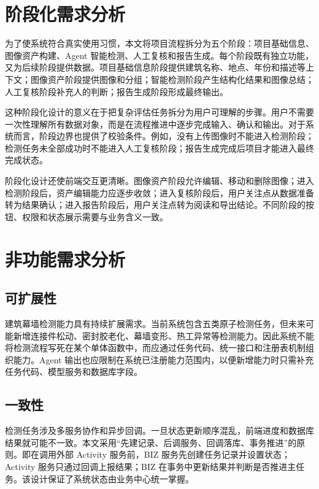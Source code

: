 \section{阶段化需求分析}
\label{sec:req-stage-analysis}

为了使系统符合真实使用习惯，本文将项目流程拆分为五个阶段：项目基础信息、图像资产构建、Agent 智能检测、人工复核和报告生成。每个阶段既有独立功能，又为后续阶段提供数据。项目基础信息阶段提供建筑名称、地点、年份和描述等上下文；图像资产阶段提供图像和分组；智能检测阶段产生结构化结果和图像总结；人工复核阶段补充人的判断；报告生成阶段形成最终输出。

这种阶段化设计的意义在于把复杂评估任务拆分为用户可理解的步骤。用户不需要一次性理解所有数据对象，而是在流程推进中逐步完成输入、确认和输出。对于系统而言，阶段边界也提供了校验条件。例如，没有上传图像时不能进入检测阶段；检测任务未全部成功时不能进入人工复核阶段；报告生成完成后项目才能进入最终完成状态。

阶段化设计还使前端交互更清晰。图像资产阶段允许编辑、移动和删除图像；进入检测阶段后，资产编辑能力应逐步收敛；进入复核阶段后，用户关注点从数据准备转为结果确认；进入报告阶段后，用户关注点转为阅读和导出结论。不同阶段的按钮、权限和状态展示需要与业务含义一致。

\section{非功能需求分析}
\label{sec:nonfunctional-analysis}

\subsection{可扩展性}
\label{subsec:scalability-analysis}

建筑幕墙检测能力具有持续扩展需求。当前系统包含五类原子检测任务，但未来可能新增连接件松动、密封胶老化、幕墙变形、热工异常等检测能力。因此系统不能将检测流程写死在某个单体函数中，而应通过任务代码、统一接口和注册表机制组织能力。Agent 输出也应限制在系统已注册能力范围内，以便新增能力时只需补充任务代码、模型服务和数据库字段。

\subsection{一致性}
\label{subsec:consistency-analysis}

检测任务涉及多服务协作和异步回调。一旦状态更新顺序混乱，前端进度和数据库结果就可能不一致。本文采用“先建记录、后调服务、回调落库、事务推进”的原则。即在调用外部 Activity 服务前，BIZ 服务先创建任务记录并设置状态；Activity 服务只通过回调上报结果；BIZ 在事务中更新结果并判断是否推进主任务。该设计保证了系统状态由业务中心统一掌握。

